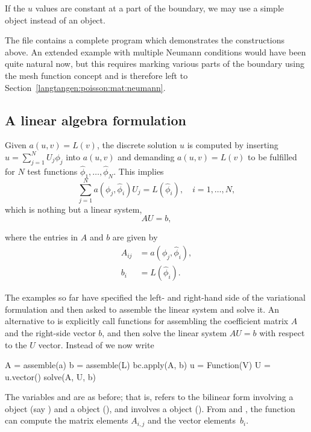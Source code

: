 If the $u$ values are constant at a part of the boundary, we may use a
simple  object instead of an  object.

The file  contains a complete program which
demonstrates the constructions above.  An extended example with multiple
Neumann conditions would have been quite natural now, but this requires
marking various parts of the boundary using the mesh function concept
and is therefore left to Section~\ref{langtangen:poisson:mat:neumann}.

\subsection{A linear algebra formulation}
\label{langtangen:poisson1:linalg}

Given $a(u,v)=L(v)$, the discrete solution $u$ is computed by
inserting $u=\sum_{j=1}^N U_j \phi_j$ into $a(u,v)$ and demanding
$a(u,v)=L(v)$ to be fulfilled for $N$ test functions
$\hat\phi_1,\ldots,\hat\phi_N$. This implies
\begin{equation}
 \sum_{j=1}^N a(\phi_j,\hat\phi_i) U_j = L(\hat\phi_i),\quad i=1,\ldots,N,
\end{equation}
which is nothing but a linear system,
\begin{equation}
  AU = b,
\end{equation}

\pagebreak

\noindent
where the entries in $A$ and $b$ are given by
\begin{equation}
\begin{split}
  A_{ij} &= a(\phi_j, \hat{\phi}_i), \\
  b_i &= L(\hat\phi_i).
\end{split}
\end{equation}

The examples so far have specified the left- and right-hand side
of the variational formulation and then asked \fenics{} to
assemble the linear system and solve it.
An alternative to is explicitly call functions for assembling the
coefficient matrix $A$ and the right-side vector $b$, and then solve
the linear system $AU=b$ with respect to the $U$ vector.
Instead of  we now write
\begin{python}
A = assemble(a)
b = assemble(L)
bc.apply(A, b)
u = Function(V)
U = u.vector()
solve(A, U, b)
\end{python}
The variables  and  are as before; that is, 
refers to the bilinear form involving a  object
(say ) and a  object (), and 
involves a  object (). From  and ,
the  function can compute the matrix elements $A_{i,j}$
and the vector elements~$b_i$.

